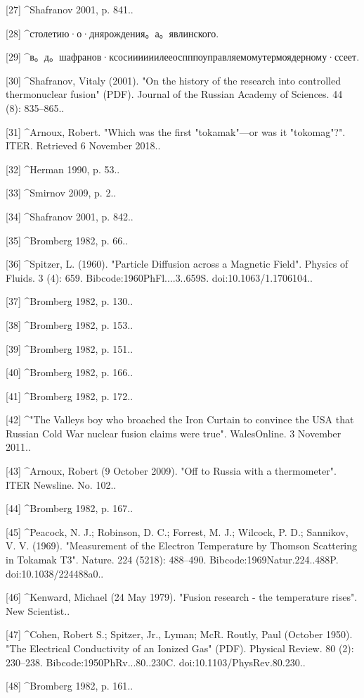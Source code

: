 [27]
^Shafranov 2001, p. 841..

[28]
^столетию·о·днярождения。а。явлинского.

[29]
^в。д。шафранов·ксосиииииилееоспппоуправляемомутермоядерному·ссеет.

[30]
^Shafranov, Vitaly (2001). "On the history of the research into controlled thermonuclear fusion" (PDF). Journal of the Russian Academy of Sciences. 44 (8): 835–865..

[31]
^Arnoux, Robert. "Which was the first "tokamak"—or was it "tokomag"?". ITER. Retrieved 6 November 2018..

[32]
^Herman 1990, p. 53..

[33]
^Smirnov 2009, p. 2..

[34]
^Shafranov 2001, p. 842..

[35]
^Bromberg 1982, p. 66..

[36]
^Spitzer, L. (1960). "Particle Diffusion across a Magnetic Field". Physics of Fluids. 3 (4): 659. Bibcode:1960PhFl....3..659S. doi:10.1063/1.1706104..

[37]
^Bromberg 1982, p. 130..

[38]
^Bromberg 1982, p. 153..

[39]
^Bromberg 1982, p. 151..

[40]
^Bromberg 1982, p. 166..

[41]
^Bromberg 1982, p. 172..

[42]
^"The Valleys boy who broached the Iron Curtain to convince the USA that Russian Cold War nuclear fusion claims were true". WalesOnline. 3 November 2011..

[43]
^Arnoux, Robert (9 October 2009). "Off to Russia with a thermometer". ITER Newsline. No. 102..

[44]
^Bromberg 1982, p. 167..

[45]
^Peacock, N. J.; Robinson, D. C.; Forrest, M. J.; Wilcock, P. D.; Sannikov, V. V. (1969). "Measurement of the Electron Temperature by Thomson Scattering in Tokamak T3". Nature. 224 (5218): 488–490. Bibcode:1969Natur.224..488P. doi:10.1038/224488a0..

[46]
^Kenward, Michael (24 May 1979). "Fusion research - the temperature rises". New Scientist..

[47]
^Cohen, Robert S.; Spitzer, Jr., Lyman; McR. Routly, Paul (October 1950). "The Electrical Conductivity of an Ionized Gas" (PDF). Physical Review. 80 (2): 230–238. Bibcode:1950PhRv...80..230C. doi:10.1103/PhysRev.80.230..

[48]
^Bromberg 1982, p. 161..

